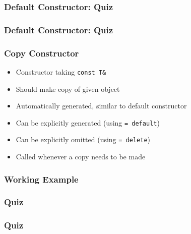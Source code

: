 \documentclass{../ucll-slides}
\begin{document}
\begin{frame}
  \frametitle{Default Constructor: Quiz}
\end{frame}

\begin{frame}
  \frametitle{Default Constructor: Quiz}
\end{frame}

\begin{frame}
  \frametitle{Copy Constructor}
  \begin{itemize}
    \item Constructor taking {\tt const T\&}
    \item Should make copy of given object
    \item Automatically generated, similar  to default constructor
    \item Can be explicitly generated (using {\tt = default})
    \item Can be explicitly omitted (using {\tt = delete})
    \item Called whenever a copy needs to be made
  \end{itemize}
  \vskip5mm
\end{frame}

\begin{frame}
  \frametitle{Working Example}
\end{frame}

\begin{frame}
  \frametitle{Quiz}
  \vskip5mm
\end{frame}

\begin{frame}
  \frametitle{Quiz}
  \vskip5mm
\end{frame}
\end{document}
